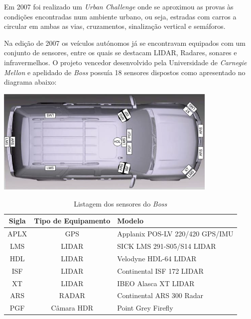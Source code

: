 Em 2007 foi realizado um \emph{Urban Challenge} onde se aproximou as provas às condições encontradas num ambiente urbano, ou seja, estradas com carros a circular em ambas as vias, cruzamentos, sinalização vertical  e semáforos.

Na edição de 2007 os veículos autónomos já se encontravam equipados com um conjunto de sensores, entre os quais se destacam LIDAR, Radares, sonares e infravermelhos. O projeto vencedor desenvolvido pela Universidade de \emph{Carnegie Mellon} e apelidado de \emph{Boss} \cite{Urmson:2008:ADU:1395073.1395077} possuía 18 sensores dispostos como apresentado no diagrama abaixo:

\begin{center}
	\includegraphics[width=0.80\textwidth]{./figures/boss_sensors.png}
	\label{fig:2}
\end{center}

\begin{table}
\begin{center}
\begin{tabular} { c c l }
	Sigla & Tipo de Equipamento & Modelo \\
	\hline
	APLX & GPS & Applanix POS-LV 220/420 GPS/IMU \\
	LMS & LIDAR & SICK LMS 291-S05/S14 LIDAR \\
	HDL & LIDAR & Velodyne HDL-64 LIDAR \\
	ISF & LIDAR & Continental ISF 172 LIDAR \\
	XT & LIDAR & IBEO Alasca XT LIDAR \\
	ARS & RADAR & Continental ARS 300 Radar \\
	PGF & Câmara HDR & Point Grey Firefly \\
	\hline
\end{tabular}
	\caption{Listagem dos sensores do \emph{Boss}}
	\label{boss_sensor}
\end{center}
\end{table}


